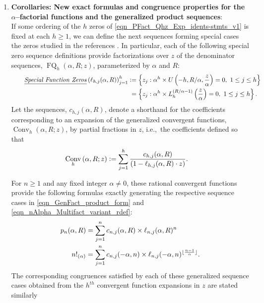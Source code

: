\documentclass[12pt,reqno]{article}
\renewenvironment{subequations}{%
  \refstepcounter{equation}%
  \edef\theparentequation{\theequation}%
  \setcounter{parentequation}{\value{equation}}%
  \setcounter{equation}{0}%
  \def\theequation{\theparentequation.\alph{equation}}%
  \ignorespaces
}{%
  \setcounter{equation}{\value{parentequation}}%
  \ignorespacesafterend
}
\numberwithin{sfootnote}{section}
\numberwithin{equation}{section}
\newcommand{\tagtext}[1]{\tag*{\underline{\textit{#1}}}}
\newcommand{\itemlabel}[1]{\textbf{#1}: \\ }
\theoremstyle{plain}
\theoremstyle{definition}
\theoremstyle{remark}
\newcommand{\ie}[0]{i.e.,\ }
\newcommand{\defequals}{\ensuremath{\vcentcolon=}}
\newcommand{\StartGroupingSubEquations}{\begin{subequations}}
\newcommand{\HypU}[3]{\ensuremath{U\left(#1, #2, #3\right)}}
\newcommand{\ConvGF}[4]{\ensuremath{\Conv_{#1}\left(#2, #3; #4\right)}}
\DeclareMathOperator{\FQ}{FQ}
\DeclareMathOperator{\Conv}{Conv}
\begin{document}
\begin{enumerate}
\item \itemlabel{Corollaries: 
       New exact formulas and congruence properties for the 
       $\alpha$--factorial functions and the generalized product sequences} 
If some ordering of the $h$ zeros of 
\eqref{eqn_PFact_Qhz_Exp_idents-stmts_v1} is fixed at each $h \geq 1$, 
we can define the next sequences 
forming special cases the zeros studied in the references 
\citep{LGWORKS-ASYMP-SPFNZEROS2008,PROPS-ZEROS-CHYPFNS80}. 
In particular, each of the following special zero sequence definitions 
provide factorizations over $z$ of the denominator sequences, 
$\FQ_h(\alpha, R; z)$, parameterized by $\alpha$ and $R$: 
\begin{align} 
\tagtext{Special Function Zeros} 
\left( \ell_{h,j}(\alpha, R) \right)_{j=1}^{h} & \defequals 
     \left\{ z_j : 
     \alpha^{h} \times \HypU{-h}{R / \alpha}{\frac{z}{\alpha}} = 0,\ 
     1 \leq j \leq h 
     \right\} \\ 
\notag 
     & \phantom{:} = 
     \left\{ z_j : 
     \alpha^{h} \times L_h^{(R / \alpha - 1)}\left(\frac{z}{\alpha}\right) = 0,\ 
     1 \leq j \leq h 
     \right\}. 
\end{align} 
Let the sequences, $c_{h,j}(\alpha, R)$, denote a shorthand 
for the coefficients corresponding to an 
expansion of the generalized convergent functions, 
$\ConvGF{h}{\alpha}{R}{z}$, by 
partial fractions in $z$, \ie the coefficients 
defined so that \citep[\S 1.2(iii)]{NISTHB} 
\begin{align*} 
\ConvGF{h}{\alpha}{R}{z} & \defequals 
     \sum_{j=1}^{h} \frac{c_{h,j}(\alpha, R)}{ 
     (1-\ell_{h,j}(\alpha, R) \cdot z)}. 
\end{align*} 
\StartGroupingSubEquations 
For $n \geq 1$ and any fixed integer $\alpha \neq 0$, these 
rational convergent functions 
provide the following formulas exactly generating the 
respective sequence cases in \eqref{eqn_GenFact_product_form} and 
\eqref{eqn_nAlpha_Multifact_variant_rdef}: 
\begin{align} 
\label{eqn_AlphaFactFn_Exact_PartialFracsRep_v1} 
p_n(\alpha, R) & = 
     \sum_{j=1}^{n} c_{n,j}(\alpha, R) \times 
     \ell_{n,j}(\alpha, R)^{n} \\ 
\notag 
n!_{(\alpha)} & = 
     \sum_{j=1}^{n} c_{n,j}(-\alpha, n) \times 
     \ell_{n,j}(-\alpha, n)^{\lfloor \frac{n-1}{\alpha} \rfloor}. 
\end{align} 
The corresponding congruences satisfied by each of these 
generalized sequence cases obtained from the $h^{th}$ 
convergent function expansions in $z$ are stated similarly 

\end{enumerate}
\end{document}
